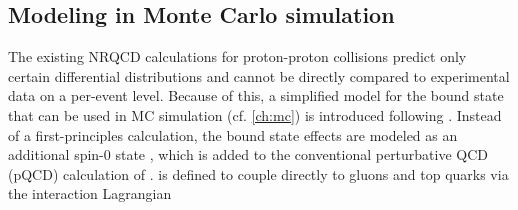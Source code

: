


\subsection{Modeling in Monte Carlo simulation}

The existing NRQCD calculations for proton-proton collisions predict only certain differential distributions and cannot be directly compared to experimental data on a per-event level. Because of this, a simplified model for the \ttbar bound state that can be used in MC simulation (cf. \cref{ch:mc}) is introduced following . Instead of a first-principles calculation, the bound state effects are modeled as an additional spin-0 state \etat, which is added to the conventional perturbative QCD (pQCD) calculation of \ttbar. \etat is defined to couple directly to gluons and top quarks via the interaction Lagrangian~\cite{Maltoni:2024tul,Fuks:2021xje}

